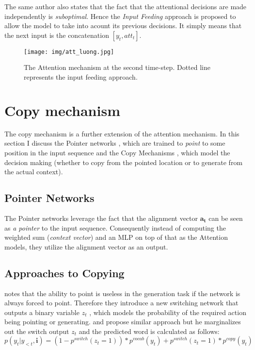 The same author also states that the fact that the attentional decisions are made independently is \emph{suboptimal}. Hence the \emph{Input Feeding} approach is proposed to allow the model to take into acount its previous decisions. It simply means that the next input is the concatenation $[y_t, att_t]$.

\begin{figure}[!h]
    \centering
    \texttt{[image: img/att\_luong.jpg]}
    \caption{\centering The Attention mechanism at the second time-step. Dotted line represents the input feeding approach.}
\end{figure}


\section{Copy mechanism} \label{copy_mech_sec}
The copy mechanism is a further extension of the attention mechanism. In this section I discuss the Pointer networks \citep{vinyals2015pointer}, which are trained to \emph{point} to some position in the input sequence and the Copy Mechanisms \citep{gulcehre2016pointing}, \citep{gu2016incorporating} which model the decision making (whether to copy from the pointed location or to generate from the actual context).

\subsection{Pointer Networks}

The Pointer networks \citep{vinyals2015pointer} leverage the fact that the alignment vector $\mathbf{a_t}$  can be seen as \emph{a pointer} to the input sequence. Consequently instead of computing the weighted sum (\emph{context vector}) and an MLP on top of that as the Attention models, they utilize the alignment vector as an output.

\subsection{Approaches to Copying}

\citep{gulcehre2016pointing} notes that the ability to point is useless in the generation task if the network is always forced to point. Therefore they introduce a new switching network that outputs a binary variable $z_t$ , which models the probability of the required action being pointing or generating. \citep{gu2016incorporating} and \citep{yang2016referenceaware} propose similar approach but he marginalizes out the switch output $z_t$ and the predicted word is calculated as follows:
\begin{equation}
    p(y_t | y_{<t}, \mathbf{i}) = ( 1 - p^{switch}(z_t = 1)) * p^{vocab}(y_t) + p^{switch}(z_t = 1) * p^{copy}(y_t)
\end{equation}

